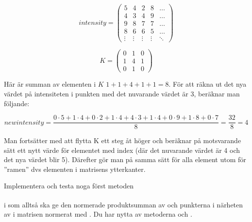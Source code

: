 \vspace{1em}
\begin{minipage}{5cm}
\begin{displaymath}
\mathit{intensity} = \left(
\begin{array}{ccccc}
5 & 4 & 2 & 8 & \ldots \\
4 & 3 & 4 & 9 & \ldots \\
9 & 8 & 7 & 7 & \ldots \\
8 & 6 & 6 & 5 & \ldots \\
\vdots & \vdots & \vdots & \vdots & \ddots
\end{array}
\right)
\end{displaymath}
\end{minipage}\hspace{2cm}
\begin{minipage}{5cm}
\begin{displaymath}
K = \left(
\begin{array}{ccc}
0 & 1 & 0 \\
1 & 4 & 1 \\
0 & 1 & 0
\end{array}
\right)
\end{displaymath}
\end{minipage}

\vspace{2em}\noindent Här är summan av elementen i $K$ $1+1+4+1+1 = 8$. För att räkna ut det nya värdet på intensiteten i punkten  med det nuvarande värdet är 3, beräknar man följande:

\begin{displaymath}
\mathit{newintensity} = \frac{0 \cdot 5 + 1 \cdot 4 + 0 \cdot 2 + 1 \cdot 4 + 4 \cdot 3 + 1 \cdot 4 + 0 \cdot 9 + 1 \cdot 8 + 0 \cdot 7}{8} = \frac{32}{8} = 4
\end{displaymath}


\noindent Man fortsätter med att flytta K ett steg åt höger och beräknar på motsvarande sätt ett nytt värde för elementet med index  (där det nuvarande värdet är 4 och det nya värdet blir 5). Därefter gör man på samma sätt för alla element utom för ”ramen” dvs elementen i matrisens ytterkanter.

Implementera och testa noga först metoden\\
\\ i  som alltså ska ge den normerade produktsumman av  och punkterna i närheten av  i matrisen  normerat med .  Du har nytta av metoderna  och .

